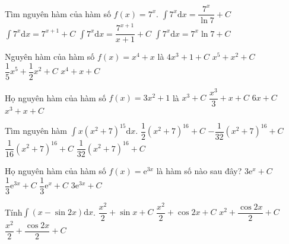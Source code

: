 \begin{ex}
	[Mã 104 2017]%
	Tìm nguyên hàm của hàm số $ f(x)=7^x$.
	\choice
	{\True $\displaystyle\int{7^x\mathrm{d}x}=\dfrac{7^x}{\ln 7}+C$}
	{$\displaystyle\int{7^x\mathrm{d}x}=7^{x+1}+C$}
	{$\displaystyle\int{7^x\mathrm{d}x}=\dfrac{7^{x+1}}{x+1}+C$}
	{$\displaystyle\int{7^x\mathrm{d}x}=7^x\ln 7+C$}
\end{ex}
\begin{ex}
	[Mã 102 2018]%
	Nguyên hàm của hàm số $ f(x)=x^4+x$ là
	\choice
	{$ 4x^3+1+C$}
	{$x^5+x^2+C$}
	{\True $\dfrac{1}{5}{x^5}+\dfrac{1}{2}{x^2}+C$}
	{$x^4+x+C$}
\end{ex}
\begin{ex}
	Họ nguyên hàm của hàm số $ f(x)=3x^2+1$ là
	\choice
	{$x^3+C$}
	{$\dfrac{x^3}{3}+x+C$}
	{$ 6x+C$}
	{\True $x^3+x+C$}
\end{ex}
\begin{ex}
	Tìm nguyên hàm $\displaystyle\int x\left(x^2+7\right)^{15}\mathrm{d}x$.
	\choice
	{$\dfrac{1}{2}{\left(x^2+7\right)^{16}}+C$}
	{$-\dfrac{1}{32}{\left(x^2+7\right)^{16}}+C$}
	{$\dfrac{1}{16}{\left(x^2+7\right)^{16}}+C$}
	{\True $\dfrac{1}{32}{\left(x^2+7\right)^{16}}+C$}
\end{ex}
\begin{ex}
	Họ nguyên hàm của hàm số $f(x)=\mathrm{e}^{3x}$ là hàm số nào sau đây?
	\choice
	{$3\mathrm{e}^x+C$}
	{\True $\dfrac{1}{3}{\mathrm{e}^{3x}}+C$}
	{$\dfrac{1}{3}{\mathrm{e}^x}+C$}
	{$3\mathrm{e}^{3x}+C$}
\end{ex}
\begin{ex}
	Tính$\displaystyle\int{\left(x-\sin 2x\right)}\mathrm{d}x$.
	\choice
	{$\dfrac{x^2}{2}+\sin x+C$}
	{$\dfrac{x^2}{2}+\cos 2x+C$}
	{$x^2+\dfrac{\cos 2x}{2}+C$}
	{\True $\dfrac{x^2}{2}+\dfrac{\cos 2x}{2}+C$}
\end{ex}
